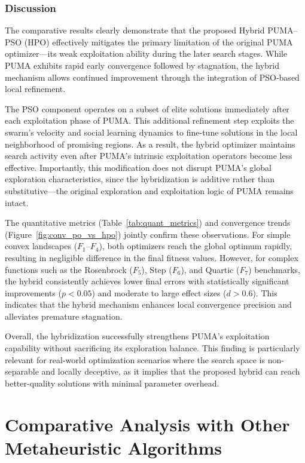 \documentclass[a4paper,12pt]{article}
\begin{document}
\subsubsection{Discussion}
\label{sec:discussion_hpo}

The comparative results clearly demonstrate that the proposed Hybrid PUMA--PSO (HPO) effectively mitigates the primary limitation of the original PUMA optimizer---its weak exploitation ability during the later search stages. 
While PUMA exhibits rapid early convergence followed by stagnation, the hybrid mechanism allows continued improvement through the integration of PSO-based local refinement.

The PSO component operates on a subset of elite solutions immediately after each exploitation phase of PUMA. 
This additional refinement step exploits the swarm’s velocity and social learning dynamics to fine-tune solutions in the local neighborhood of promising regions. 
As a result, the hybrid optimizer maintains search activity even after PUMA’s intrinsic exploitation operators become less effective. 
Importantly, this modification does not disrupt PUMA’s global exploration characteristics, since the hybridization is additive rather than substitutive---the original exploration and exploitation logic of PUMA remains intact.

The quantitative metrics (Table~\ref{tab:quant_metrics}) and convergence trends (Figure~\ref{fig:conv_po_vs_hpo}) jointly confirm these observations. 
For simple convex landscapes ($F_1$--$F_4$), both optimizers reach the global optimum rapidly, resulting in negligible difference in the final fitness values. 
However, for complex functions such as the Rosenbrock ($F_5$), Step ($F_6$), and Quartic ($F_7$) benchmarks, the hybrid consistently achieves lower final errors with statistically significant improvements ($p<0.05$) and moderate to large effect sizes ($d>0.6$). 
This indicates that the hybrid mechanism enhances local convergence precision and alleviates premature stagnation.

Overall, the hybridization successfully strengthens PUMA’s exploitation capability without sacrificing its exploration balance. 
This finding is particularly relevant for real-world optimization scenarios where the search space is non-separable and locally deceptive, as it implies that the proposed hybrid can reach better-quality solutions with minimal parameter overhead.

\section{Comparative Analysis with Other Metaheuristic Algorithms}
\label{sec:comparison_others}
\end{document}
